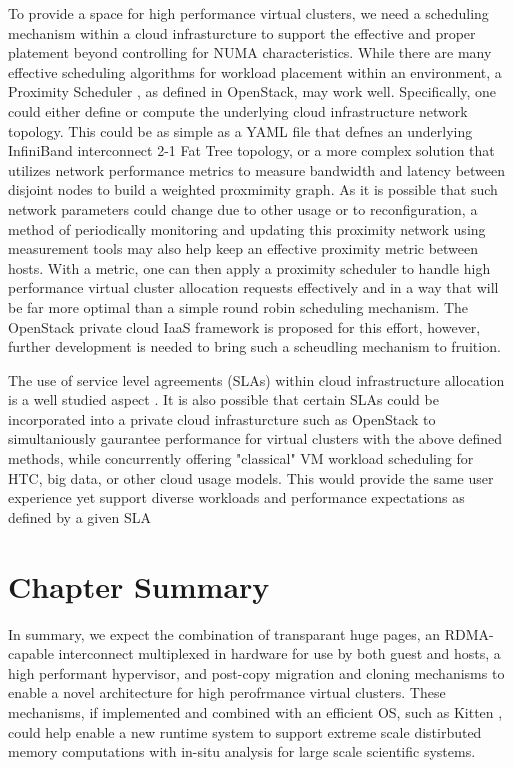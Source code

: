 To provide a space for high performance virtual clusters, we need a scheduling mechanism within a cloud infrasturcture to support the effective and proper platement beyond controlling for NUMA characteristics. While there are many effective scheduling algorithms for workload placement within an environment, a Proximity Scheduler \cite{www-proximity-scheduler}, as defined in OpenStack, may work well. Specifically, one could either define or compute the underlying cloud infrastructure network topology. This could be as simple as a YAML file that defnes an underlying InfiniBand interconnect 2-1 Fat Tree topology, or a more complex solution that utilizes network performance metrics to measure bandwidth and latency between disjoint nodes to build a weighted proxmimity graph. As it is possible that such network parameters could change due to other usage or to reconfiguration, a method of periodically monitoring and updating this proximity network using measurement tools \cite{hanemann2005perfsonar} may also help keep an effective proximity metric between hosts. With a metric, one can then apply a proximity scheduler to handle high performance virtual cluster allocation requests effectively and in a way that will be far more optimal than a simple round robin scheduling mechanism. The OpenStack private cloud IaaS framework is proposed for this effort, however, further development is needed to bring such a scheudling mechanism to fruition.  

The use of service level agreements (SLAs) within cloud infrastructure allocation is a well studied aspect \cite{serrano2013towards}.  It is also possible that certain SLAs could be incorporated into a private cloud infrasturcture such as OpenStack to simultaniously gaurantee performance for virtual clusters with the above defined methods, while concurrently offering "classical" VM workload scheduling for HTC, big data, or other cloud usage models. This would provide the same user experience yet support diverse workloads and performance expectations as defined by a given SLA  

 

\section{Chapter Summary}
\label{chap7sum}



In summary, we expect the combination of transparant huge pages, an RDMA-capable interconnect multiplexed in hardware for use by both guest and hosts, a high performant hypervisor, and post-copy migration and cloning mechanisms to enable a novel architecture for high perofrmance virtual clusters. These mechanisms, if implemented and combined with an efficient OS, such as Kitten \cite{pedretti2011kitten}, could help enable a new runtime system to support extreme scale distirbuted memory computations with in-situ analysis \cite{ahrens2010visualization, vishwanath2011toward} for large scale scientific systems. 




